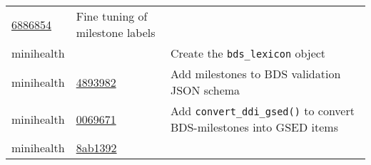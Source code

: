 \documentclass[]{book}
\begin{document}
\begin{longtable}[]{@{}lll@{}}
\begin{minipage}[t]{0.29\columnwidth}
\href{https://github.com/stefvanbuuren/dscore/commit/688685477082ac6c040b9d18035b5178a39a5cc0}{6886854}\strut
\end{minipage} & \begin{minipage}[t]{0.36\columnwidth}\raggedright
Fine tuning of milestone labels\strut
\end{minipage}\tabularnewline
\begin{minipage}[t]{0.26\columnwidth}\raggedright
minihealth\strut
\end{minipage} & \begin{minipage}[t]{0.29\columnwidth}\raggedright
\strut
\end{minipage} & \begin{minipage}[t]{0.36\columnwidth}\raggedright
Create the \texttt{bds\_lexicon} object\strut
\end{minipage}\tabularnewline
\begin{minipage}[t]{0.26\columnwidth}\raggedright
minihealth\strut
\end{minipage} & \begin{minipage}[t]{0.29\columnwidth}\raggedright
\href{https://github.com/stefvanbuuren/minihealth/commit/4893982631717539b070c8d19b88b2b10319f2ee}{4893982}\strut
\end{minipage} & \begin{minipage}[t]{0.36\columnwidth}\raggedright
Add milestones to BDS validation JSON schema\strut
\end{minipage}\tabularnewline
\begin{minipage}[t]{0.26\columnwidth}\raggedright
minihealth\strut
\end{minipage} & \begin{minipage}[t]{0.29\columnwidth}\raggedright
\href{https://github.com/stefvanbuuren/minihealth/commit/0069671c8d09f64f2436faa93b764bd288324fcc}{0069671}\strut
\end{minipage} & \begin{minipage}[t]{0.36\columnwidth}\raggedright
Add \texttt{convert\_ddi\_gsed()} to convert BDS-milestones into GSED items\strut
\end{minipage}\tabularnewline
\begin{minipage}[t]{0.26\columnwidth}\raggedright
minihealth\strut
\end{minipage} & \begin{minipage}[t]{0.29\columnwidth}\raggedright
\href{https://github.com/stefvanbuuren/minihealth/commit/8ab1392fdbe781adfa004fcadb4f661c14487cf2}{8ab1392}\strut
\end{minipage} & \begin{minipage}[t]{0.36\columnwidth}\raggedright

\end{minipage}
\end{longtable}
\end{document}
